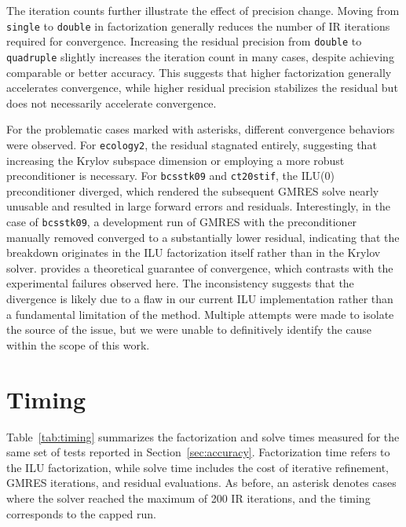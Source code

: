 The iteration counts further illustrate the effect of precision change. Moving
from \texttt{single} to \texttt{double} in factorization generally reduces the
number of IR iterations required for convergence. Increasing the residual
precision from \texttt{double} to \texttt{quadruple} slightly increases the
iteration count in many cases, despite achieving comparable or better accuracy.
This suggests that higher factorization generally accelerates convergence, while
higher residual precision stabilizes the residual but does not necessarily
accelerate convergence.

For the problematic cases marked with asterisks, different convergence behaviors
were observed. For \texttt{ecology2}, the residual stagnated entirely,
suggesting that increasing the Krylov subspace dimension or employing a more
robust preconditioner is necessary. For \texttt{bcsstk09} and \texttt{ct20stif},
the ILU(0) preconditioner diverged, which rendered the subsequent GMRES solve
nearly unusable and resulted in large forward errors and residuals.
Interestingly, in the case of \texttt{bcsstk09}, a development run of GMRES with
the preconditioner manually removed converged to a substantially lower residual,
indicating that the breakdown originates in the ILU factorization itself rather
than in the Krylov solver. \textcite{chow_fine-grained_2015} provides a
theoretical guarantee of convergence, which contrasts with the experimental
failures observed here. The inconsistency suggests that the divergence is likely
due to a flaw in our current ILU implementation rather than a fundamental
limitation of the method. Multiple attempts were made to isolate the source of
the issue, but we were unable to definitively identify the cause within the
scope of this work.

\section{Timing}
\label{sec:timing}

Table~\ref{tab:timing} summarizes the factorization and solve times measured for
the same set of tests reported in Section~\ref{sec:accuracy}. Factorization time
refers to the ILU factorization, while solve time includes the cost of iterative
refinement, GMRES iterations, and residual evaluations. As before, an asterisk
denotes cases where the solver reached the maximum of 200 IR iterations, and the
timing corresponds to the capped run.

